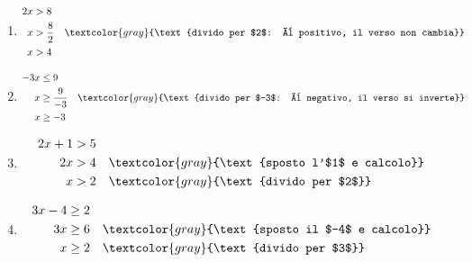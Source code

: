 \begin{question}[ID=1.1, subtitle={Disequazioni di primo grado}, difficulty=facile, tags={disequazioni lineari}]
\begin{explanation}
\begin{enumerate}
\[\begin{aligned}
    x &\leq 7 && \textcolor{gray}{\text{calcolo}}
    \end{aligned}\]
    \item \[\begin{aligned}
    2x &> 8\\
    x &> \dfrac{8}{2} && \textcolor{gray}{\text{divido per $2$: è positivo, il verso non cambia}}\\
    x &> 4
    \end{aligned}\]
    \item \[\begin{aligned}
    -3x &\leq 9\\
    x &\geq \dfrac{9}{-3} && \textcolor{gray}{\text{divido per $-3$: è negativo, il verso si inverte}}\\
    x &\geq -3
    \end{aligned}\]
    \item \[\begin{aligned}
    2x+1 &> 5\\
    2x &> 4 && \textcolor{gray}{\text{sposto l'$1$ e calcolo}}\\
    x &> 2 && \textcolor{gray}{\text{divido per $2$}}
    \end{aligned}\]
    \item \[\begin{aligned}
    3x-4 &\geq 2\\
    3x &\geq 6 && \textcolor{gray}{\text{sposto il $-4$ e calcolo}}\\
    x &\geq 2 && \textcolor{gray}{\text{divido per $3$}}
    \end{aligned}\]
\end{enumerate}
\end{explanation}
\end{question}


